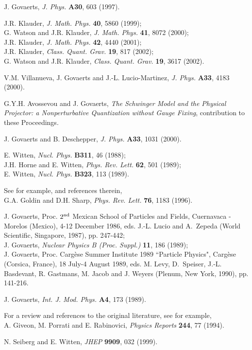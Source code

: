\documentclass[a4paper,11pt]{article}
\begin{document}
\begin{thebibliography}{99}
 J. Govaerts, {\em J. Phys.\/} {\bf A30}, 603 (1997).

J.R. Klauder, {\em J. Math. Phys.\/} {\bf 40}, 5860 (1999);\\
G. Watson and J.R. Klauder, {\em J. Math. Phys.\/} {\bf 41}, 8072 (2000);\\
J.R. Klauder, {\em J. Math. Phys.\/} {\bf 42}, 4440 (2001);\\
J.R. Klauder, {\em Class. Quant. Grav.\/} {\bf 19}, 817 (2002);\\
G. Watson and J.R. Klauder, {\em Class. Quant. Grav.\/} {\bf 19}, 3617 (2002).

V.M. Villanueva, J. Govaerts and J.-L. Lucio-Martinez, {\em J. Phys.\/}
{\bf A33}, 4183 (2000).

 G.Y.H. Avossevou and J. Govaerts, {\sl The Schwinger Model
and the Physical Projector: a Nonperturbative Quantization without Gauge
Fixing\/}, contribution to these Proceedings.

J. Govaerts and B. Deschepper, {\em J. Phys.\/} {\bf A33}, 1031 (2000).

E. Witten, {\em Nucl. Phys.\/} {\bf B311}, 46 (1988);\\
J.H. Horne and E. Witten, {\em Phys. Rev. Lett.\/} {\bf 62}, 501 (1989);\\
E. Witten, {\em Nucl. Phys.\/} {\bf B323}, 113 (1989).

 See for example, and references therein,\\
G.A. Goldin and D.H. Sharp, {\em Phys. Rev. Lett.\/} {\bf 76}, 1183 (1996).

J. Govaerts, Proc. $2^{\rm nd}$ Mexican School of Particles and 
Fields, Cuernavaca - Morelos (Mexico), 4-12 December 1986,
eds. J.-L. Lucio and A.~Zepeda (World Scientific, Singapore, 1987), pp. 247-442;\\
J. Govaerts, {\sl Nuclear Physics B (Proc. Suppl.)} {\bf 11}, 186 (1989);\\
J. Govaerts, Proc. Carg\`ese Summer Institute 1989 
``Particle Physics", Carg\`ese (Corsica, France), 18 July-4 August 1989,
eds. M. Levy, D.~Speiser, J.-L. Basdevant, R. Gastmans,
M. Jacob and J. Weyers (Plenum, New York, 1990), pp. 141-216.

J. Govaerts, {\em Int. J. Mod. Phys.} {\bf A4}, 173 (1989).

 For a review and references to the original literature, see
for example,\\
A. Giveon, M. Porrati and E. Rabinovici, {\em Physics Reports\/} {\bf 244}, 
77 (1994).

N. Seiberg and E. Witten, {\em JHEP\/} {\bf 9909}, 032 (1999).

\end{thebibliography}
\end{document}
